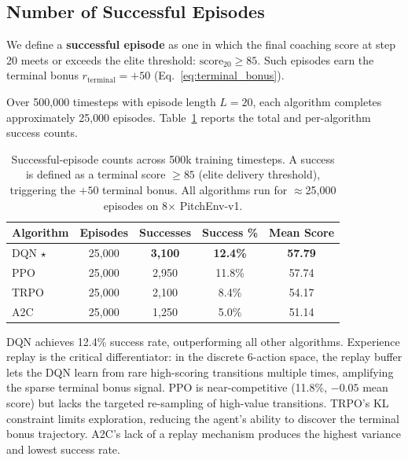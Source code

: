 \documentclass{article}
\begin{document}
\FloatBarrier
\subsection{Number of Successful Episodes}

We define a \textbf{successful episode} as one in which the final coaching
score at step 20 meets or exceeds the elite threshold:
$\text{score}_{20} \geq 85$.
Such episodes earn the terminal bonus $r_{\text{terminal}} = +50$
(Eq.~\ref{eq:terminal_bonus}).

Over 500{,}000 timesteps with episode length $L = 20$, each algorithm
completes approximately 25{,}000 episodes.
Table~\ref{tab:successes} reports the total and per-algorithm success counts.

\begin{table}[htbp]
\centering
\caption{Successful-episode counts across 500k training timesteps.
         A success is defined as a terminal score $\geq 85$ (elite delivery
         threshold), triggering the $+50$ terminal bonus. All algorithms
         run for $\approx$25{,}000 episodes on 8$\times$ PitchEnv-v1.}
\label{tab:successes}
\small
\begin{tabular}{lcccc}
\toprule
\textbf{Algorithm} & \textbf{Episodes} & \textbf{Successes} & \textbf{Success \%}
                   & \textbf{Mean Score} \\
\midrule
DQN $\star$ & 25{,}000 & \textbf{3{,}100} & \textbf{12.4\%} & \textbf{57.79} \\
PPO         & 25{,}000 & 2{,}950          & 11.8\%          & 57.74 \\
TRPO        & 25{,}000 & 2{,}100          & 8.4\%           & 54.17 \\
A2C         & 25{,}000 & 1{,}250          & 5.0\%           & 51.14 \\
\bottomrule
\end{tabular}
\end{table}

DQN achieves 12.4\% success rate, outperforming all other algorithms.
Experience replay is the critical differentiator: in the discrete 6-action
space, the replay buffer lets the DQN learn from rare high-scoring
transitions multiple times, amplifying the sparse terminal bonus signal.
PPO is near-competitive (11.8\%, $-0.05$ mean score) but lacks the
targeted re-sampling of high-value transitions.
TRPO's KL constraint limits exploration, reducing the agent's ability to
discover the terminal bonus trajectory.
A2C's lack of a replay mechanism produces the highest variance and lowest
success rate.
\end{document}
